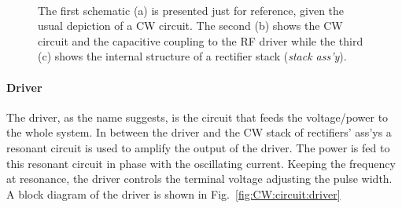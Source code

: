 \begin{refsection}
        \begin{figure}[ht]   
            \centering
            \label{fig:CW:circuit:standard}
            \\
            \caption[CW: circuit and rectifiers]{The first schematic (a) is presented just for reference, given the usual depiction of a CW circuit. The second (b) shows the CW circuit and the capacitive coupling to the RF driver while the third (c) shows the internal structure of a rectifier stack (\textit{stack ass'y}).}
        \end{figure}

        \paragraph{Driver}
        The driver, as the name suggests, is the circuit that feeds the voltage/power to the whole system.
        In between the driver and the CW stack of rectifiers' ass'ys a resonant circuit is used to amplify the output of the driver.
        The power is fed to this resonant circuit in phase with the oscillating current.
        Keeping the frequency at resonance, the driver controls the terminal voltage adjusting the pulse width.
        A block diagram of the driver is shown in Fig.~\ref{fig:CW:circuit:driver}


\end{refsection}
